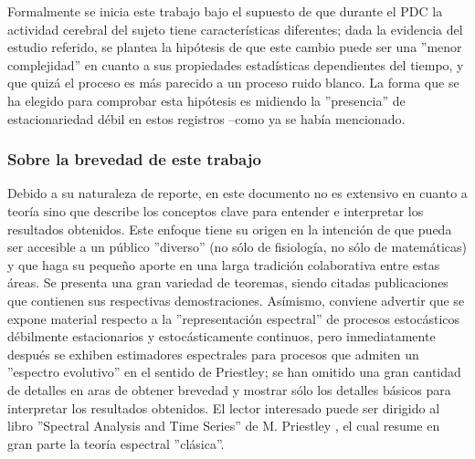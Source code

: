 Formalmente se inicia
este trabajo bajo el supuesto de que durante el PDC la actividad cerebral
del sujeto tiene caracter\'isticas diferentes; 
dada la evidencia del estudio referido, se plantea la hip\'otesis de que este cambio puede ser
una ''menor complejidad'' en cuanto a sus propiedades estad\'isticas 
dependientes del tiempo, y que quiz\'a el proceso es m\'as parecido a un proceso ruido blanco.
La forma que se ha elegido para comprobar esta hip\'otesis es midiendo la ''presencia'' de
estacionariedad d\'ebil en estos registros --como ya se hab\'ia mencionado.

\subsubsection{Sobre la brevedad de este trabajo}

Debido a su naturaleza de reporte, en este documento no es extensivo en cuanto a teor\'ia sino que
describe los conceptos clave para entender e interpretar los resultados obtenidos.
Este enfoque tiene su origen en la intenci\'on de que pueda 
ser accesible a un p\'ublico ''diverso'' (no s\'olo de fisiolog\'ia, no s\'olo de matem\'aticas)
y que haga su peque\~no aporte en una larga tradici\'on colaborativa entre estas \'areas.
Se presenta una gran variedad de teoremas, siendo citadas publicaciones que contienen
sus respectivas demostraciones. As\'imismo, conviene advertir que se expone material respecto a
la ''representaci\'on espectral'' de procesos estoc\'asticos d\'ebilmente estacionarios y
estoc\'asticamente continuos, pero inmediatamente despu\'es 
se exhiben estimadores espectrales para procesos 
que admiten un ''espectro evolutivo'' en el sentido de Priestley; se han omitido una gran cantidad
de detalles en aras de obtener brevedad y mostrar s\'olo los detalles b\'asicos
para interpretar los resultados obtenidos. 
El lector interesado puede ser dirigido al libro ''Spectral Analysis and Time Series'' de
M. Priestley \cite{Priestley81}, el cual resume en gran parte la teor\'ia espectral ''cl\'asica''.


